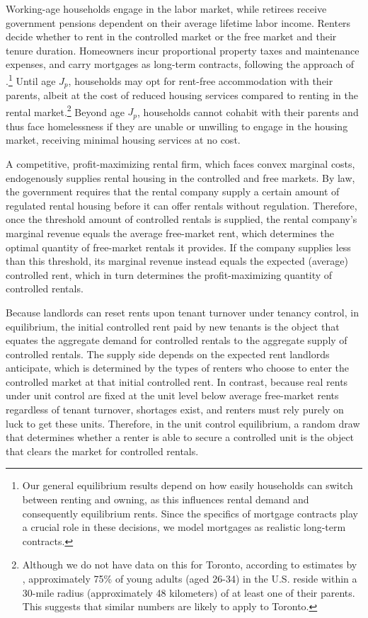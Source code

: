\documentclass[parskip=full]{article}
\begin{document}
Working-age households engage in the labor market, while retirees receive government pensions dependent on their average lifetime labor income. Renters decide whether to rent in the controlled market or the free market and their tenure duration. Homeowners incur proportional property taxes and maintenance expenses, and carry mortgages as long-term contracts, following the approach of \citet{kkk-2021}.\footnote{Our general equilibrium results depend on how easily households can switch between renting and owning, as this influences rental demand and consequently equilibrium rents. Since the specifics of mortgage contracts play a crucial role in these decisions, we model mortgages as realistic long-term contracts.} Until age $J_{p}$, households may opt for rent-free accommodation with their parents, albeit at the cost of reduced housing services compared to renting in the rental market.\footnote{Although we do not have data on this for Toronto, according to estimates by \citet{spatial_distance-2020}, approximately 75\% of young adults (aged 26-34) in the U.S. reside within a 30-mile radius (approximately 48 kilometers) of at least one of their parents. This suggests that similar numbers are likely to apply to Toronto.} Beyond age $J_{p}$, households cannot cohabit with their parents and thus face homelessness if they are unable or unwilling to engage in the housing market, receiving minimal housing services at no cost.

A competitive, profit-maximizing rental firm, which faces convex marginal costs, endogenously supplies rental housing in the controlled and free markets. By law, the government requires that the rental company supply a certain amount of regulated rental housing before it can offer rentals without regulation. Therefore, once the threshold amount of controlled rentals is supplied, the rental company's marginal revenue equals the average free-market rent, which determines the optimal quantity of free-market rentals it provides. If the company supplies less than this threshold, its marginal revenue instead equals the expected (average) controlled rent, which in turn determines the profit-maximizing quantity of controlled rentals.

Because landlords can reset rents upon tenant turnover under tenancy control, in equilibrium, the initial controlled rent paid by new tenants is the object that equates the aggregate demand for controlled rentals to the aggregate supply of controlled rentals. The supply side depends on the expected rent landlords anticipate, which is determined by the types of renters who choose to enter the controlled market at that initial controlled rent. In contrast, because real rents under unit control are fixed at the unit level below average free-market rents regardless of tenant turnover, shortages exist, and renters must rely purely on luck to get these units. Therefore, in the unit control equilibrium, a random draw that determines whether a renter is able to secure a controlled unit is the object that clears the market for controlled rentals.
\end{document}
